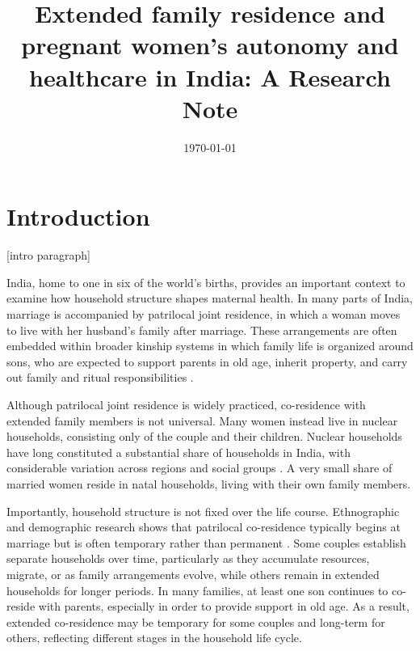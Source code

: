 \documentclass[12pt]{article}
\begin{document}
\title{Extended family residence and pregnant women's autonomy and healthcare in India: A Research Note}

\date{\today}


\section{Introduction}

[intro paragraph]

India, home to one in six of the world’s births, provides an important context to examine how household structure shapes maternal health. In many parts of India, marriage is accompanied by patrilocal joint residence, in which a woman moves to live with her husband’s family after marriage. These arrangements are often embedded within broader kinship systems in which family life is organized around sons, who are expected to support parents in old age, inherit property, and carry out family and ritual responsibilities \citep{jayachandran2015roots}. 

Although patrilocal joint residence is widely practiced, co-residence with extended family members is not universal. Many women instead live in nuclear households, consisting only of the couple and their children. Nuclear households have long constituted a substantial share of households in India, with considerable variation across regions and social groups \citep{breton2021modernisation}. A very small share of married women reside in natal households, living with their own family members. 

Importantly, household structure is not fixed over the life course. Ethnographic and demographic research shows that patrilocal co-residence typically begins at marriage but is often temporary rather than permanent \citep{breton2019modernization}. Some couples establish separate households over time, particularly as they accumulate resources, migrate, or as family arrangements evolve, while others remain in extended households for longer periods. In many families, at least one son continues to co-reside with parents, especially in order to provide support in old age. As a result, extended co-residence may be temporary for some couples and long-term for others, reflecting different stages in the household life cycle.
\end{document}
